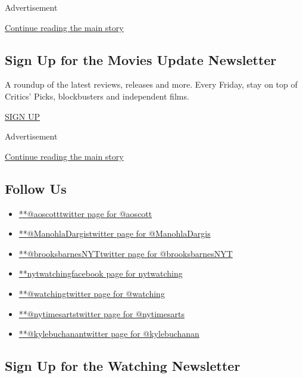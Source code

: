 Advertisement

\protect\hyperlink{after-mid2}{Continue reading the main story}

\hypertarget{sign-up-for-the-movies-update-newsletter}{%
\subsection{Sign Up for the Movies Update
Newsletter}\label{sign-up-for-the-movies-update-newsletter}}

A roundup of the latest reviews, releases and more. Every Friday, stay
on top of Critics' Picks, blockbusters and independent films.

\href{/newsletters/signup/FM}{SIGN UP}

Advertisement

\protect\hyperlink{after-mktg}{Continue reading the main story}

\hypertarget{follow-us}{%
\subsection{Follow Us}\label{follow-us}}

\begin{itemize}
\tightlist
\item
  \href{https://twitter.com/aoscott}{**@aoscotttwitter page for
  @aoscott}
\item
  \href{https://twitter.com/ManohlaDargis}{**@ManohlaDargistwitter page
  for @ManohlaDargis}
\item
  \href{https://twitter.com/brooksbarnesNYT}{**@brooksbarnesNYTtwitter
  page for @brooksbarnesNYT}
\item
  \href{https://www.facebookcorewwwi.onion/nytwatching}{**nytwatchingfacebook
  page for nytwatching}
\item
  \href{https://twitter.com/watching}{**@watchingtwitter page for
  @watching}
\item
  \href{https://twitter.com/nytimesarts}{**@nytimesartstwitter page for
  @nytimesarts}
\item
  \href{https://twitter.com/kylebuchanan}{**@kylebuchanantwitter page
  for @kylebuchanan}
\end{itemize}

\hypertarget{sign-up-for-the-watching-newsletter}{%
\subsection{Sign Up for the Watching
Newsletter}\label{sign-up-for-the-watching-newsletter}}

